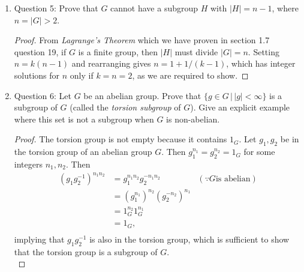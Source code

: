\documentclass{article}
\begin{document}
\begin{enumerate}
\begin{enumerate}
      \item Question 5: Prove that $G$ cannot have a subgroup $H$ with
        $|H|=n-1$, where $n=|G|>2$.

        \begin{proof}
          From \textit{Lagrange's Theorem} which we have proven in section
          1.7 question 19, if $G$ is a finite group, then $|H|$ must divide
          $|G|=n$. Setting $n=k(n-1)$ and rearranging gives $n=1+1/(k-1)$,
          which has integer solutions for $n$ only if $k=n=2$, as we are
          required to show.
        \end{proof}

      \item Question 6: Let $G$ be an abelian group. Prove that $\{g\in
        G\,|\,|g|<\infty\}$ is a subgroup of $G$ (called the
        \textit{torsion subgroup} of $G$). Give an explicit example
        where this set is not a subgroup when $G$ is non-abelian.

        \begin{proof}
          The torsion group is not empty because it contains $1_G$.
          Let $g_1,g_2$ be in the torsion group of an abelian group $G$.
          Then $g_1^{n_1}=g_2^{n_2}=1_G$ for some integers $n_1,n_2$. Then
          \begin{align*}
            (g_1g_2^{-1})^{n_1n_2} & = g_1^{n_1n_2}g_2^{-n_1n_2} & (\because G \text{is abelian}) \\
                                   & = (g_1^{n_1})^{n_2}(g_2^{-n_2})^{n_1} & \\
                                   & = 1_G^{n_2}1_G^{n_1} & \\
                                   & = 1_G,               & \\
          \end{align*}
          implying that $g_1g_2^{-1}$ is also in the torsion group, which
          is sufficient to show that the torsion group is a subgroup of
          $G$. \\


\end{proof}
\end{enumerate}
\end{enumerate}
\end{document}

